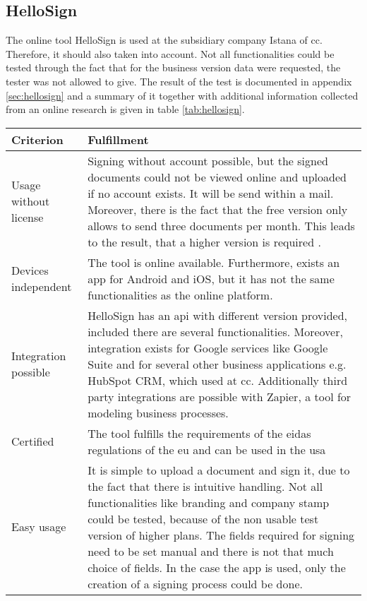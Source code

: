 \subsection{HelloSign}
The online tool HelloSign is used at the subsidiary company Istana of \gls{cc}. Therefore, it should also taken into account. Not all functionalities could be tested through the fact that for the business version data were requested, the tester was not allowed to give. The result of the test is documented in appendix \ref{sec:hellosign} and a summary of it together with additional information collected from an online research is given in table \ref{tab:hellosign}.
\begin{table}[h]
	\begin{tabular}{|p{4cm}|p{10cm}|} \hline
		Criterion & Fulfillment \\ \hline
		Usage without license & Signing without account possible, but the signed documents could not be viewed online and uploaded if no account exists. It will be send within a mail. Moreover, there is the fact that the free version only allows to send three documents per month. This leads to the result, that a higher version is required \parencite{hellosign2018price}. \\ \hline
		Devices independent & The tool is online available. Furthermore, exists an \gls{app} for Android and iOS, but it has not the same functionalities as the online platform.  \parencite{hellosign2018legal} \\ \hline
		Integration possible & HelloSign has an \gls{api} with different version provided, included there are several functionalities. Moreover, integration exists for Google services like Google Suite and for several other business applications e.g. HubSpot CRM, which used at \gls{cc}. Additionally third party integrations are possible with Zapier, a tool for modeling business processes. \parencite{hellosign2018integration,hellosign2018api} \\ \hline
		Certified & The tool fulfills the requirements of the \gls{eidas} regulations of the \gls{eu} and can be used in the \gls{usa} \parencite{hellosign2018legal} \\ \hline
		Easy usage & It is simple to upload a document and sign it, due to the fact that there is intuitive handling. Not all functionalities like branding and company stamp could be tested, because of the non usable test version of higher plans. The fields required for signing need to be set manual and there is not that much choice of fields. In the case the \gls{app} is used, only the creation of a signing process could be done. \\ \hline

\end{tabular}
\end{table}
